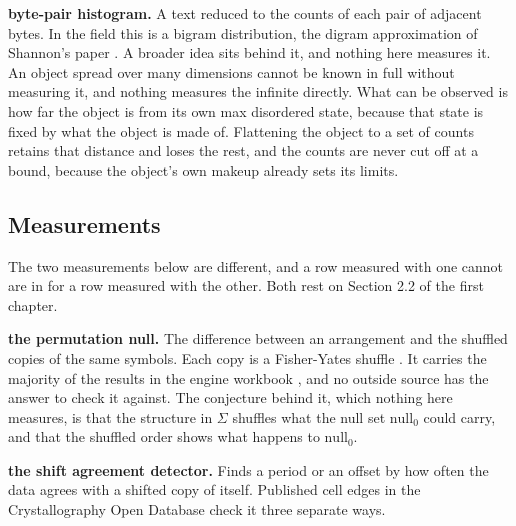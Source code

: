 \noindent\textbf{byte-pair histogram.} A text reduced to the counts of each pair of adjacent bytes. In the field this is a bigram distribution, the digram approximation of Shannon's paper \cite{src:Shannon}. A broader idea sits behind it, and nothing here measures it. An object spread over many dimensions cannot be known in full without measuring it, and nothing measures the infinite directly. What can be observed is how far the object is from its own max disordered state, because that state is fixed by what the object is made of. Flattening the object to a set of counts retains that distance and loses the rest, and the counts are never cut off at a bound, because the object's own makeup already sets its limits.

\subsection{Measurements}

\enlargethispage{4\baselineskip}

The two measurements below are different, and a row measured with one cannot are in for a row measured with the other. Both rest on Section 2.2 of the first chapter.

\noindent\textbf{the permutation null.} The difference between an arrangement and the shuffled copies of the same symbols. Each copy is a Fisher-Yates shuffle \cite{src:Fisher}. It carries the majority of the results in the engine workbook \cite{src:Quigg-orior-workbook}, and no outside source has the answer to check it against. The conjecture behind it, which nothing here measures, is that the structure in \(\Sigma\) shuffles what the null set \(\text{null}_0\) could carry, and that the shuffled order shows what happens to \(\text{null}_0\).

\noindent\textbf{the shift agreement detector.} Finds a period or an offset by how often the data agrees with a shifted copy of itself. Published cell edges in the Crystallography Open Database \cite{src:Crystallography-Open-Database} check it three separate ways.
